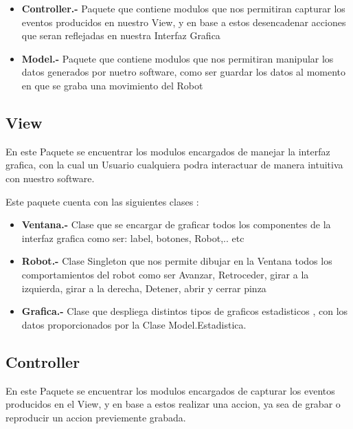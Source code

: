 \documentclass[letterpaper,12pt]{article}
\begin{document}
{\begin{itemize}
	\item \textbf{Controller.- }Paquete que contiene modulos que nos permitiran capturar los eventos producidos en nuestro View, y en base a estos desencadenar acciones que seran reflejadas en nuestra Interfaz Grafica
		
	\item \textbf{Model.- }Paquete que contiene modulos que nos permitiran manipular los datos generados por nuetro software, como ser guardar los datos al momento en que se graba una movimiento del Robot
	
\end{itemize}


\subsection{View}
En este Paquete se encuentrar los modulos encargados de manejar la interfaz grafica, con la cual un Usuario cualquiera podra interactuar de manera intuitiva con nuestro software.

Este paquete cuenta con las siguientes clases :\\
\begin{itemize}
	\item \textbf{Ventana.- }Clase que se encargar de graficar todos los componentes de la interfaz grafica como ser: label, botones, Robot,.. etc
	
	\item \textbf{Robot.- }Clase Singleton que nos permite dibujar en la Ventana todos los comportamientos del robot como ser Avanzar, Retroceder, girar a la izquierda, girar a la derecha, Detener, abrir y cerrar pinza
	
	\item \textbf{Grafica.- }Clase que despliega distintos tipos de graficos estadisticos , con los datos proporcionados por la Clase Model.Estadistica.
	
\end{itemize}


\subsection{Controller}
En este Paquete se encuentrar los modulos encargados de capturar los eventos producidos en el View, y en base a estos realizar una accion, ya sea de grabar o reproducir un accion previemente grabada.\\

}
\end{document}
